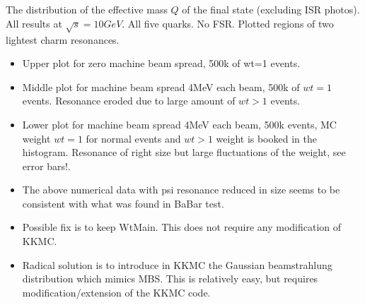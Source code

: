\documentclass[dvips]{seminar}                      %
\begin{document}
\begin{slide}

\begin{minipage}{52mm}{
\\
\\
}
\end{minipage}
\begin{minipage}{52mm}
\cbl\small
{}
The distribution of the effective mass $Q$ of the final state
(excluding ISR photos). All results at $\sqrt{s}=10GeV$.
All five quarks. No FSR.
Plotted regions of two lightest charm resonances.
\begin{itemize}
\item
  Upper plot for zero machine beam spread, 500k of wt=1 events.
\item
  Middle plot for machine beam spread 4MeV each beam, 500k of $wt=1$ events.
  {\crd Resonance eroded due to large amount of $wt>1$ events}.
\item
  Lower plot for machine beam spread 4MeV each beam, 500k events, MC weight $wt=1$
  for normal events and $wt>1$ weight is booked in the histogram.
  {\crd Resonance of right size but large fluctuations of the weight, see error bars!}.  
\end{itemize}
\end{minipage}
\vfill
\end{slide}   %




\begin{slide}

{\bf\cbl
  \begin{itemize}
  \item
    The above numerical data with psi resonance reduced in size
    seems to be consistent with what was found in BaBar test.
  \item
    Possible fix is to keep WtMain. This does not require any modification of KKMC.
  \item
    Radical solution is to introduce in KKMC the Gaussian beamstrahlung distribution
    which mimics MBS.
    This is relatively easy, but requires modification/extension of the KKMC code.
  \end{itemize}
}

\vfill
\end{slide}    %
\end{document}
